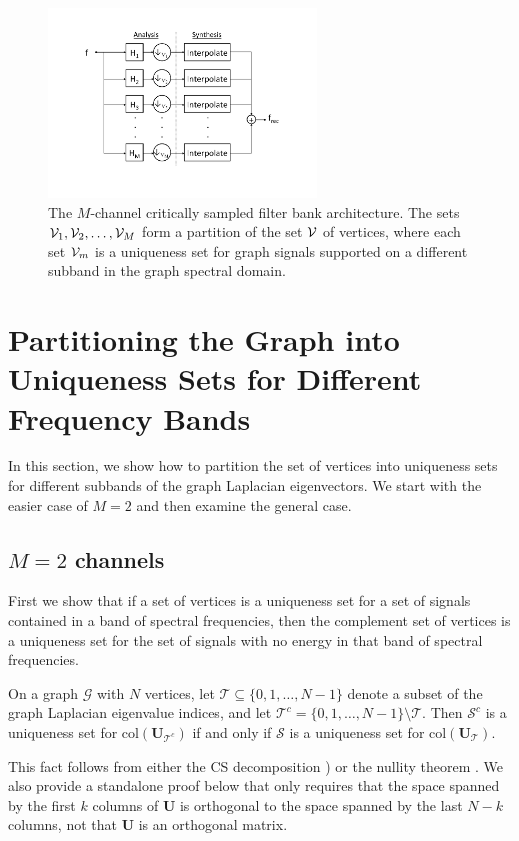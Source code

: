 \documentclass[journal, 10pt]{IEEEtran}
\begin{document}
\begin{figure}[t]
\centerline{\includegraphics[width=2.8in]{fig_mcsfb_structure3}}
\caption{The $M$-channel critically sampled filter bank architecture. The sets ${\mathcal{V}}_1, {\mathcal{V}}_2, \ldots,{\mathcal{V}}_M$ form a partition of the set ${\mathcal{V}}$ of vertices, where each set ${\mathcal{V}}_m$ is a uniqueness set for graph signals supported on a different subband in the graph spectral domain.}\label{Fig:arch}
\end{figure}




\section{Partitioning the Graph into Uniqueness Sets for Different Frequency Bands}\label{Se:partition}

In this section, we show how to partition the set of vertices into uniqueness sets for different subbands of the graph Laplacian eigenvectors. We start with the easier case of $M=2$ and then examine the general case.

\subsection{$M=2$ channels}
First we show that if a set of vertices is a uniqueness set for a set of signals contained in a band of spectral frequencies, then the complement set of vertices is a uniqueness set for the set of signals with no energy in that band of spectral frequencies.
\begin{proposition}\label{Le:highpass_uniqueness}
On a graph ${\mathcal G}$ with $N$ vertices, let 
${\mathcal T} \subseteq \{0,1,\ldots,N-1\}$ denote a subset of the graph Laplacian eigenvalue indices, and let ${\mathcal T}^c=\{0,1,\ldots,N-1\} \setminus {\mathcal T}$.
Then 
$\mathcal{S}^c$ is a uniqueness set for $\mbox{col}({\mathbf{U}}_{{\mathcal T}^c})$
 if and only if
$\mathcal{S}$ is a uniqueness set for 
$\mbox{col}({\mathbf{U}}_{{\mathcal T}})$.
\end{proposition}
This fact follows from either the CS decomposition \cite[Equation (32)]{paige})
or the nullity theorem \cite[Theorem 2.1]{strangInterplay}.  
We also provide a standalone proof below that only requires that the space spanned by the first $k$ columns of ${\mathbf{U}}$ is orthogonal to the space spanned by the last $N-k$ columns, not that ${\mathbf{U}}$ is an orthogonal matrix.
\end{document}

